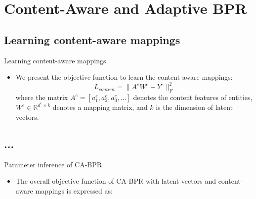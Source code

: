 \section{Content-Aware and Adaptive BPR}

\subsection*{Learning content-aware mappings}
\begin{frame}{Learning content-aware mappings}
	\begin{itemize}
		\item  We present the objective function to learn the
		content-aware mappings:
		\begin{equation}
		L_{content} = \| A^eW^e - Y^e\|_F^2
		\end{equation}
		where the matrix $A^e = \left[a_1^e,a_2^e,a_3^e,\dots\right]$ denotes the content features of entities, $W^e \in \mathbb{R}^{d^e \times k}$ denotes a mapping matrix, and $k$ is the
		dimension of latent vectors.
	\end{itemize}
\end{frame}



\subsection*{...}
\begin{frame}{Parameter inference of CA-BPR}
	\begin{itemize}
		\item The overall objective function of CA-BPR with latent vectors and content-aware mappings is expressed as:
		
	\end{itemize}
\end{frame} %

